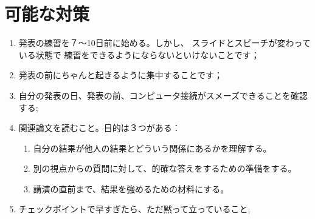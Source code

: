 \documentclass[12pt]{article} %
\theoremstyle{remark}
\begin{document}
\section{可能な対策}
\begin{enumerate}
	\item 発表の練習を７〜10日前に始める。しかし、
		スライドとスピーチが変わっている状態で
		練習をできるようにならないといけないことです；
	\item 発表の前にちゃんと起きるように集中することです；
	\item 自分の発表の日、発表の前、コンピュータ接続がスメーズできることを確認する;
	\item 関連論文を読むこと。目的は３つがある：\begin{enumerate}
	    	\item 自分の結果が他人の結果とどういう関係にあるかを理解する。
		\item 別の視点からの質問に対して、的確な答えをするための準備をする。
	 	\item 講演の直前まで、結果を強めるための材料にする。
		\end{enumerate}
	\item チェックポイントで早すぎたら、ただ黙って立っていること;
\end{enumerate}
\end{document}
